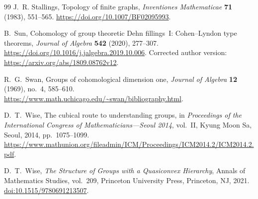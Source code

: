 \begin{thebibliography}{99}
J.~R. Stallings,
Topology of finite graphs,
\emph{Inventiones Mathematicae} \textbf{71} (1983), 551--565.
\url{https://doi.org/10.1007/BF02095993}.

B.~Sun,
Cohomology of group theoretic Dehn fillings~I: Cohen--Lyndon type theorems,
\emph{Journal of Algebra} \textbf{542} (2020), 277--307.
\url{https://doi.org/10.1016/j.jalgebra.2019.10.006}.
Corrected author version:
\url{https://arxiv.org/abs/1809.08762v12}.

R.~G.~Swan,
Groups of cohomological dimension one,
\emph{Journal of Algebra} \textbf{12} (1969), no.~4, 585--610.
\url{https://www.math.uchicago.edu/~swan/bibliography.html}.

D.~T.~Wise,
The cubical route to understanding groups,
in \emph{Proceedings of the International Congress of Mathematicians---Seoul 2014},
vol.~II, Kyung Moon Sa, Seoul, 2014, pp.~1075--1099.
\url{https://www.mathunion.org/fileadmin/ICM/Proceedings/ICM2014.2/ICM2014.2.pdf}.

D.~T.~Wise,
\emph{The Structure of Groups with a Quasiconvex Hierarchy},
Annals of Mathematics Studies, vol.~209,
Princeton University Press, Princeton, NJ, 2021.
\href{https://doi.org/10.1515/9780691213507}{doi:10.1515/9780691213507}.

\end{thebibliography}
